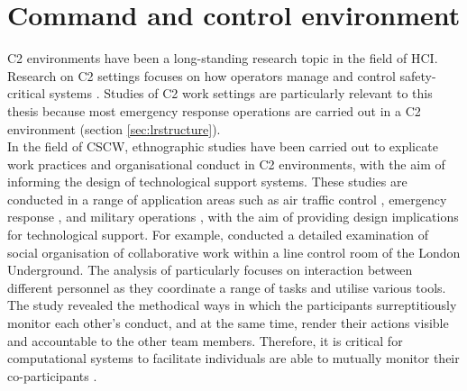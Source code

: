 

\section{Command and control environment}\label{sec:LRC2}
\acf{C2} environments have been a long-standing research topic in the field of \acf{HCI}. Research on \ac{C2} settings focuses on how operators manage and control safety-critical systems \citep{Fischer2015}. Studies of \ac{C2} work settings are particularly relevant to this thesis because most emergency response operations are carried out in a \ac{C2} environment (section \ref{sec:lrstructure}). \\

In the field of \ac{CSCW}, ethnographic studies have been carried out to explicate work practices and organisational conduct in \ac{C2} environments, with the aim of informing the design of technological support systems. These studies are conducted in a range of application areas such as air traffic control \citep{RichardH.R.HarperJohnA.Hughes1989}, emergency response \citep{Fischer2015} , and military operations \citep{Tolcher2005}, with the aim of providing design implications for technological support. For example, \citep{Heath1992} conducted a detailed examination of social organisation of collaborative work within a line control room of the London Underground. The analysis of \citep{Heath1992} particularly focuses on interaction between different personnel as they coordinate a range of tasks and utilise various tools. The study revealed the methodical ways in which the participants surreptitiously monitor each other's conduct, and at the same time, render their actions visible and accountable to the other team members. Therefore, it is critical for computational systems to facilitate individuals are able to mutually monitor their co-participants \citep{Heath1992}.\\

